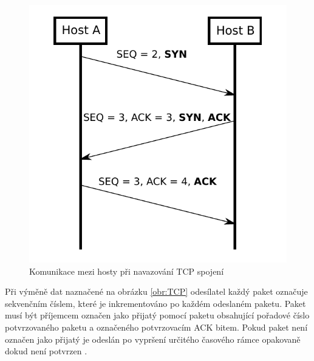     \begin{figure}[!h]
      \begin{center}
        \includegraphics[scale=0.7]{obrazky/prace/SYN_TCP.pdf}
      \end{center}
      \caption[Navázání spojení TCP]{Komunikace mezi hosty při navazování TCP spojení \cite{Jerabek2013}}
      \label{obr:SYN_TCP}
    \end{figure}
 
\par Při výměně dat naznačené na obrázku \ref{obr:TCP} odesílatel každý paket označuje sekvenčním číslem, které je inkrementováno po každém odeslaném paketu. Paket musí být příjemcem označen jako přijatý pomocí paketu obsahující pořadové číslo potvrzovaného paketu a označeného potvrzovacím ACK bitem. Pokud paket není označen jako přijatý je odeslán po vypršení určitého časového rámce opakovaně dokud není potvrzen \cite{Foxc2022}.

